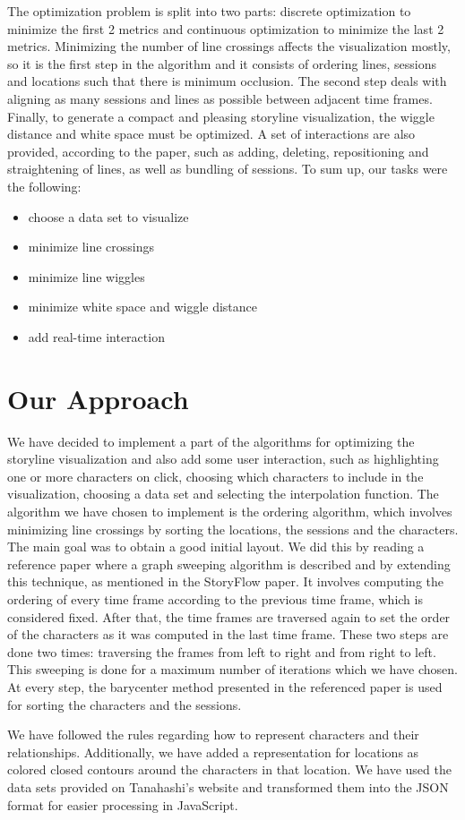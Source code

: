 \documentclass{report}
\begin{document}
\par
The optimization problem is split into two parts: discrete optimization to minimize the first 2 metrics and continuous optimization to minimize the last 2 metrics. Minimizing the number of line crossings affects the visualization mostly, so it is the first step in the algorithm and it consists of ordering lines, sessions and locations such that there is minimum occlusion. The second step deals with aligning as many sessions and lines as possible between adjacent time frames. Finally, to generate a compact and pleasing storyline visualization, the wiggle distance and white space must be optimized. A set of interactions are also provided, according to the paper, such as adding, deleting, repositioning and straightening of lines, as well as bundling of sessions. To sum up, our tasks were the following:
\begin{itemize}
\item choose a data set to visualize
\item minimize line crossings
\item minimize line wiggles
\item minimize white space and wiggle distance
\item add real-time interaction
\end{itemize}

\chapter{Our Approach}
\par
We have decided to implement a part of the algorithms for optimizing the storyline visualization and also add some user interaction, such as highlighting one or more characters on click, choosing which characters to include in the visualization, choosing a data set and selecting the interpolation function. The algorithm we have chosen to implement is the ordering algorithm, which involves minimizing line crossings by sorting the locations, the sessions and the characters. The main goal was to obtain a good initial layout. We did this by reading a reference paper \cite{4308636} where a graph sweeping algorithm is described and by extending this technique, as mentioned in the StoryFlow paper. It involves computing the ordering of every time frame according to the previous time frame, which is considered fixed. After that, the time frames are traversed again to set the order of the characters as it was computed in the last time frame. These two steps are done two times: traversing the frames from left to right and from right to left. This sweeping is done for a maximum number of iterations which we have chosen. At every step, the barycenter method presented in the referenced paper is used for sorting the characters and the sessions.
\par
We have followed the rules regarding how to represent characters and their relationships. Additionally, we have added a representation for locations as colored closed contours around the characters in that location. We have used the data sets provided on Tanahashi's website \cite{website:tanahashi} and transformed them into the JSON format for easier processing in JavaScript.
\end{document}
